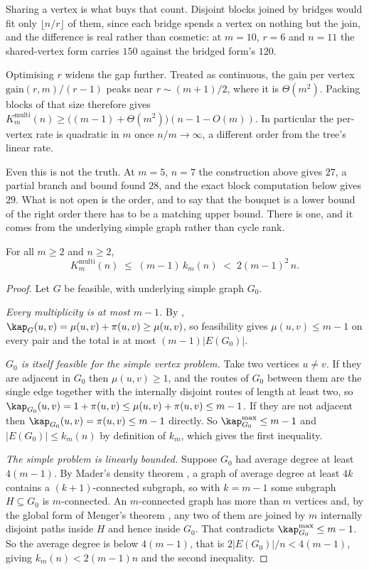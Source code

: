 Sharing a vertex is what buys that count. Disjoint blocks joined by bridges would fit only $\lfloor n/r \rfloor$ of them, since each bridge spends a vertex on nothing but the join, and the difference is real rather than cosmetic: at $m = 10$, $r = 6$ and $n = 11$ the shared-vertex form carries $150$ against the bridged form's $120$.

Optimising $r$ widens the gap further. Treated as continuous, the gain per vertex $\mathrm{gain}(r,m)/(r-1)$ peaks near $r \sim (m+1)/2$, where it is $\Theta(m^2)$. Packing blocks of that size therefore gives $K_m^{\mathrm{multi}}(n) \ge \bigl((m-1) + \Theta(m^2)\bigr)(n-1-O(m))$. In particular the per-vertex rate is quadratic in $m$ once $n/m\to\infty$, a different order from the tree's linear rate.

Even this is not the truth. At $m = 5$, $n = 7$ the construction above gives
$27$, a partial branch and bound found $28$, and the exact block computation
below gives $29$. What is not open is the order, and to say that the bouquet is
a lower bound of the right order there has to be a matching upper bound. There
is one, and it comes from the underlying simple graph rather than cycle rank.

\begin{proposition}\label{prop:multi-vertex-upper}
For all $m \ge 2$ and $n \ge 2$,
\[
    K_m^{\mathrm{multi}}(n) \;\le\; (m-1)\,k_m(n) \;<\; 2(m-1)^2\,n .
\]
\end{proposition}

\begin{proof}
Let $G$ be feasible, with underlying simple graph $G_0$.

\emph{Every multiplicity is at most $m-1$.} By , $\kap_G(u,v) = \mu(u,v) + \pi(u,v) \ge \mu(u,v)$, so feasibility gives $\mu(u,v) \le m-1$ on every pair and the total is at most $(m-1)|E(G_0)|$.

\emph{$G_0$ is itself feasible for the simple vertex problem.} Take two vertices $u \ne v$. If they are adjacent in $G_0$ then $\mu(u,v) \ge 1$, and the routes of $G_0$ between them are the single edge together with the internally disjoint routes of length at least two, so $\kap_{G_0}(u,v) = 1 + \pi(u,v) \le \mu(u,v) + \pi(u,v) \le m-1$. If they are not adjacent then $\kap_{G_0}(u,v) = \pi(u,v) \le m-1$ directly. So $\kap^{\max}_{G_0} \le m-1$ and $|E(G_0)| \le k_m(n)$ by definition of $k_m$, which gives the first inequality.

\emph{The simple problem is linearly bounded.} Suppose $G_0$ had average degree at least $4(m-1)$. By Mader's density theorem \cite{Mader72}, a graph of average degree at least $4k$ contains a $(k+1)$-connected subgraph, so with $k = m-1$ some subgraph $H \subseteq G_0$ is $m$-connected. An $m$-connected graph has more than $m$ vertices and, by the global form of Menger's theorem \cite[Ch.~3]{Diestel17}, any two of them are joined by $m$ internally disjoint paths inside $H$ and hence inside $G_0$. That contradicts $\kap^{\max}_{G_0} \le m-1$. So the average degree is below $4(m-1)$, that is $2|E(G_0)|/n < 4(m-1)$, giving $k_m(n) < 2(m-1)n$ and the second inequality.
\end{proof}

